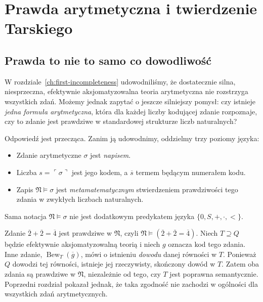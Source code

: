 \chapter{Prawda arytmetyczna i twierdzenie Tarskiego}\label{ch:tarski-truth}

\section{Prawda to nie to samo co dowodliwość}
W rozdziale~\ref{ch:first-incompleteness} udowodniliśmy,
że dostatecznie silna, niesprzeczna, efektywnie
aksjomatyzowalna teoria arytmetyczna nie rozstrzyga
wszystkich zdań. Możemy jednak zapytać o jeszcze
silniejszy pomysł: czy istnieje \emph{jedna formuła
arytmetyczna}, która dla każdej liczby kodującej
zdanie rozpoznaje, czy to zdanie jest prawdziwe
w standardowej strukturze liczb naturalnych?

Odpowiedź jest przecząca. Zanim ją udowodnimy,
oddzielmy trzy poziomy języka:
\begin{itemize}
\item Zdanie arytmetyczne $\sigma$ jest \emph{napisem}.
\item Liczba $s=\ulcorner\sigma\urcorner$ jest jego kodem,
      a $\overline s$ termem będącym numerałem kodu.
\item Zapis $\mathfrak N\models\sigma$ jest
      \emph{metamatematycznym} stwierdzeniem prawdziwości
      tego zdania w zwykłych liczbach naturalnych.
\end{itemize}
Sama notacja $\mathfrak N\models\sigma$ nie jest dodatkowym
predykatem języka $\{0,S,+,\cdot,<\}$.

\begin{przyklad}
Zdanie $\overline2+\overline2=\overline4$ jest prawdziwe
w $\mathfrak N$, czyli
$\mathfrak N\models(\overline2+\overline2=\overline4)$.
Niech $T\supseteq Q$ będzie efektywnie aksjomatyzowalną
teorią i niech $g$ oznacza kod tego zdania. Inne zdanie,
$\operatorname{Bew}_T(\overline g)$, mówi o istnieniu
\emph{dowodu} danej równości w $T$.
Ponieważ $Q$ dowodzi tej równości, istnieje jej rzeczywisty,
skończony dowód w $T$. Zatem oba zdania są prawdziwe
w $\mathfrak N$, niezależnie od tego, czy $T$ jest poprawna
semantycznie. Poprzedni rozdział pokazał jednak, że taka
zgodność nie zachodzi w ogólności dla wszystkich zdań
arytmetycznych.
\end{przyklad}

